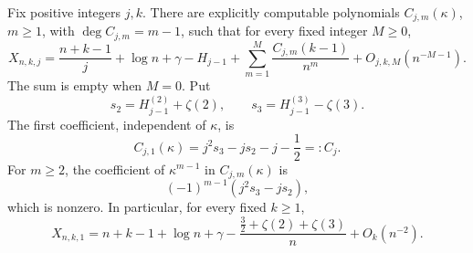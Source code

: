 \begin{theorem}
\label{thm:cohen-extreme-roots}
Fix positive integers $j,k$.  There are explicitly computable
polynomials $C_{j,m}(\kappa)$, $m\geq1$, with
$\deg C_{j,m}=m-1$, such that for every fixed integer $M\geq0$,
\begin{equation}\label{eq:cohen-extreme-root-all-orders}
 X_{n,k,j}=\frac{n+k-1}{j}+\log n+\gamma-H_{j-1}
     +\sum_{m=1}^{M}\frac{C_{j,m}(k-1)}{n^m}
     +O_{j,k,M}(n^{-M-1}).
\end{equation}
The sum is empty when $M=0$.  Put
\[
 s_2=H_{j-1}^{(2)}+\zeta(2),\qquad
 s_3=H_{j-1}^{(3)}-\zeta(3).
\]
The first coefficient, independent of $\kappa$, is
\begin{equation}\label{eq:cohen-Cj}
 C_{j,1}(\kappa)=j^2s_3-js_2-j-\frac12=:C_j.
\end{equation}
For $m\geq2$, the coefficient of $\kappa^{m-1}$ in
$C_{j,m}(\kappa)$ is
\begin{equation}\label{eq:cohen-leading-parameter-coefficient}
 (-1)^{m-1}(j^2s_3-js_2),
\end{equation}
which is nonzero.  In particular, for every fixed $k\geq1$,
\begin{equation}\label{eq:cohen-largest-root}
 X_{n,k,1}=n+k-1+\log n+\gamma
     -\frac{\frac32+\zeta(2)+\zeta(3)}{n}+O_k(n^{-2}).
\end{equation}
\end{theorem}

